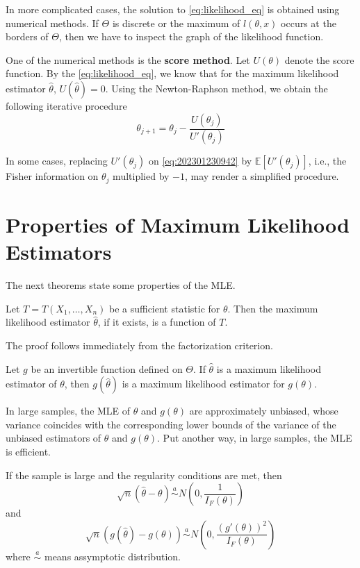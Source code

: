 \documentclass[12pt,a4paper]{report}
\begin{document}
In more complicated cases, the solution to \eqref{eq:likelihood_eq} is obtained using numerical methods. If $\Theta$ is discrete or the maximum of $l(\theta, x)$ occurs at the borders of $\Theta$, then we have to inspect the graph of the likelihood function.

One of the numerical methods is the \textbf{score method}. Let $U(\theta)$ denote the score function. By the \eqref{eq:likelihood_eq}, we know that for the maximum likelihood estimator $\hat{\theta}$, $U(\hat{\theta}) = 0$. Using the Newton-Raphson method, we obtain the following iterative procedure 
\begin{equation}\label{eq:202301230942}
    \theta_{j+1} = \theta_j - \frac{U(\theta_j)}{U'(\theta_j)}
\end{equation}

In some cases, replacing $U'(\theta_j)$ on \eqref{eq:202301230942} by $\mathbb{E}[U'(\theta_j)]$, i.e., the Fisher information on $\theta_j$ multiplied by $-1$, may render a simplified procedure. 

\section{Properties of Maximum Likelihood Estimators}

The next theorems state some properties of the MLE.

\begin{theorem}
    Let $T = T(X_1, \ldots, X_n)$ be a sufficient statistic for $\theta$. Then the maximum likelihood estimator $\hat{\theta}$, if it exists, is a function of $T$.
\end{theorem}

The proof follows immediately from the factorization criterion. 

\begin{theorem}
    Let $g$ be an invertible function defined on $\Theta$. If $\hat{\theta}$ is a maximum likelihood estimator of $\theta$, then $g(\hat{\theta})$ is a maximum likelihood estimator for $g(\theta)$.
\end{theorem}

In large samples, the MLE of $\theta$ and $g(\theta)$ are approximately unbiased, whose variance coincides with the corresponding lower bounds of the variance of the unbiased estimators of $\theta$ and $g(\theta)$. Put another way, in large samples, the MLE is efficient.

\begin{theorem}\label{thm:202301270939}
    If the sample is large and the regularity conditions are met, then 
    \begin{equation*}
        \sqrt{n}(\hat{\theta} - \theta) \overset{a}{\sim} N \left( 0, \frac{1}{I_F(\theta)} \right)
    \end{equation*}
    and 
    \begin{equation*}
        \sqrt{n}(g(\hat{\theta}) - g(\theta)) \overset{a}{\sim} N \left( 0, \frac{(g'(\theta))^2}{I_F(\theta)} \right)
    \end{equation*}
    where $\overset{a}{\sim}$ means assymptotic distribution.
\end{theorem}
\end{document}
